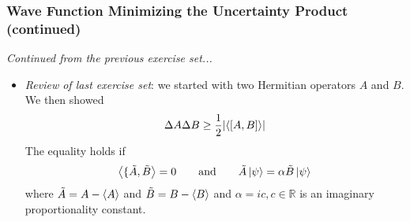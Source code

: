 \documentclass[11pt, a4paper]{article}
\newcommand{\eqtext}[1]{\qquad \text{#1} \qquad}
\begin{document}
\subsubsection{Wave Function Minimizing the Uncertainty Product (continued)}
\textit{Continued from the previous exercise set...}
\begin{itemize}
	\item \textit{Review of last exercise set}: we started with two Hermitian operators $ A  $ and $ B $. We then showed
	\begin{equation*}
		\Delta A \Delta B \geq \frac{1}{2}\abs{\langle [A, B] \rangle}
	\end{equation*}
	The equality holds if
	\begin{equation*}
		\ev{\{\tilde{A}, \tilde{B}} = 0 \eqtext{and} \tilde{A}\ket{\psi} = \alpha \tilde{B}\ket{\psi}
	\end{equation*}
	where $ \tilde{A} = A - \ev{A}$ and $ \tilde{B} = B - \ev{B}$ and $ \alpha = ic, c \in \mathbb{R} $ is an imaginary proportionality constant.
	

\end{itemize}
\end{document}
